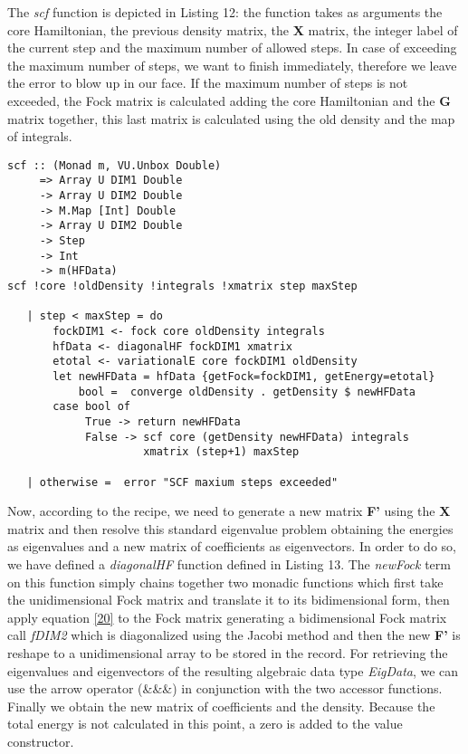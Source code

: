 \documentclass{tmr}
\begin{document}
The \textit{scf} function is depicted in Listing 12: the function takes as arguments
the core Hamiltonian, the previous density matrix, the \textbf{X} matrix, the integer label
of the current step and the maximum number of allowed steps. In case of exceeding
the maximum number of steps, we want to finish immediately, therefore we leave the error
to blow up in our face. If the maximum number of steps is not exceeded, the Fock matrix
is calculated adding the core Hamiltonian and the \textbf{G} matrix together, this last matrix is
calculated using the old density and the map of integrals.

\begin{lstlisting}[float,captionpos=b,belowcaptionskip=4pt, caption= Self Consistent Field Function]   
scf :: (Monad m, VU.Unbox Double)
     => Array U DIM1 Double
     -> Array U DIM2 Double
     -> M.Map [Int] Double
     -> Array U DIM2 Double
     -> Step
     -> Int
     -> m(HFData)
scf !core !oldDensity !integrals !xmatrix step maxStep
                                                                   
   | step < maxStep = do
       fockDIM1 <- fock core oldDensity integrals
       hfData <- diagonalHF fockDIM1 xmatrix
       etotal <- variationalE core fockDIM1 oldDensity
       let newHFData = hfData {getFock=fockDIM1, getEnergy=etotal}
           bool =  converge oldDensity . getDensity $ newHFData
       case bool of
            True -> return newHFData
            False -> scf core (getDensity newHFData) integrals
                     xmatrix (step+1) maxStep

   | otherwise =  error "SCF maxium steps exceeded"

\end{lstlisting}

Now, according to the recipe, we need to generate a new matrix \textbf{F'} using
the \textbf{X} matrix and then resolve this standard eigenvalue problem obtaining
the energies as eigenvalues and a new matrix of coefficients as eigenvectors. In order to
do so, we have defined a \textit{diagonalHF} function defined in Listing 13. The \textit{newFock} 
term on this function simply chains together two monadic functions which first take 
the unidimensional Fock matrix and translate it to its bidimensional form, then apply
equation \eqref{20} to the Fock matrix generating a bidimensional Fock matrix call \textit{fDIM2}
which is diagonalized using the Jacobi method and then the new \textbf{F'} is reshape to
a unidimensional array to be stored in the record. For retrieving the eigenvalues and eigenvectors of
the resulting algebraic data type \textit{EigData}, we can use the arrow operator (\&\&\&)
 in conjunction with the two accessor functions. Finally we obtain the new matrix of
coefficients and the density. Because the total energy is not calculated in this point,
a zero is added to the value constructor. 
\end{document}
